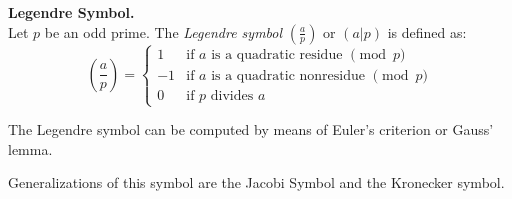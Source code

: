 \documentclass[12pt]{article}
\begin{document}
\textbf{Legendre Symbol.}\\
Let $p$ be an odd prime. The \emph{Legendre symbol} $\left(\frac{a}{p}\right)$ or $(a|p)$ is defined as:
\[
\left(\frac{a}{p}\right) =
\begin{cases}
1 &\text{if }a \text{ is a quadratic residue }\pmod{p}\\
-1 &\text{if }a \text{ is a quadratic nonresidue }\pmod{p}\\
0 & \text{if } p \text{ divides }a
\end{cases}
\]

The Legendre symbol can be computed by means of Euler's criterion or Gauss' lemma.

Generalizations of this symbol are the Jacobi Symbol and the Kronecker symbol.
\end{document}
